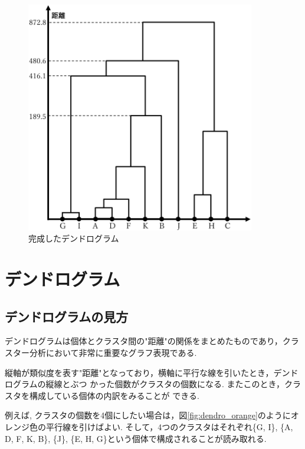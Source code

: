 \documentclass[a4paper,11pt,dvipdfmx]{jsarticle}
\begin{document}
\begin{figure}[htb]
  \centering
  \includegraphics[width=10cm]{../pics/dendro_final.png}
  \caption{完成したデンドログラム}
  \label{fig:dendro_final}
\end{figure}

\section{デンドログラム}
\label{sec:dendrogram}
\subsection*{デンドログラムの見方}
デンドログラムは個体とクラスタ間の"距離"の関係をまとめたものであり，クラスター分析において非常に重要なグラフ表現である.

縦軸が類似度を表す"距離"となっており，横軸に平行な線を引いたとき，デンドログラムの縦線とぶつ かった個数がクラスタの個数になる. またこのとき，クラスタを構成している個体の内訳をみることが できる.

例えば, クラスタの個数を4個にしたい場合は，図\ref{fig:dendro_orange}のようにオレンジ色の平行線を引けばよい. そして，4つのクラスタはそれぞれ\{G, I\}, \{A, D, F, K, B\}, \{J\}, \{E, H, G\}という個体で構成されることが読み取れる. 
\end{document}
